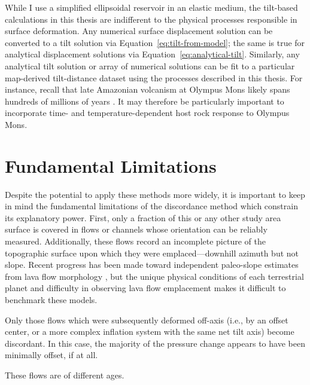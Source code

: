 While I use a simplified ellipsoidal reservoir in an elastic medium, the tilt-based calculations in this thesis are indifferent to the physical processes responsible in surface deformation. Any numerical surface displacement solution can be converted to a tilt solution via Equation~\eqref{eq:tilt-from-model}; the same is true for analytical displacement solutions via Equation~\eqref{eq:analytical-tilt}. Similarly, any analytical tilt solution or array of numerical solutions can be fit to a particular map-derived tilt-distance dataset using the processes described in this thesis. For instance, recall that late Amazonian volcanism at Olympus Mons likely spans hundreds of millions of years \parencite{neukum_recent_2004}. It may therefore be particularly important to incorporate time- and temperature-dependent host rock response \parencite[e.g.,][]{gregg_catastrophic_2012} to Olympus Mons.

\section{Fundamental Limitations}

Despite the potential to apply these methods more widely, it is important to keep in mind the fundamental limitations of the discordance method which constrain its explanatory power. First, only a fraction of this or any other study area surface is covered in flows or channels whose orientation can be reliably measured.  Additionally, these flows record an incomplete picture of the topographic surface upon which they were emplaced---downhill azimuth but not slope. Recent progress has been made toward independent paleo-slope estimates from lava flow morphology \parencite{wadge_lobes_1991, peitersen_correlations_2000, peters_lava_2021}, but the unique physical conditions of each terrestrial planet and difficulty in observing lava flow emplacement makes it difficult to benchmark these models.

Only those flows which were subsequently deformed off-axis (i.e., by an offset center, or a more complex inflation system with the same net tilt axis) become discordant. In this case, the majority of the pressure change appears to have been minimally offset, if at all.

These flows are of different ages.

